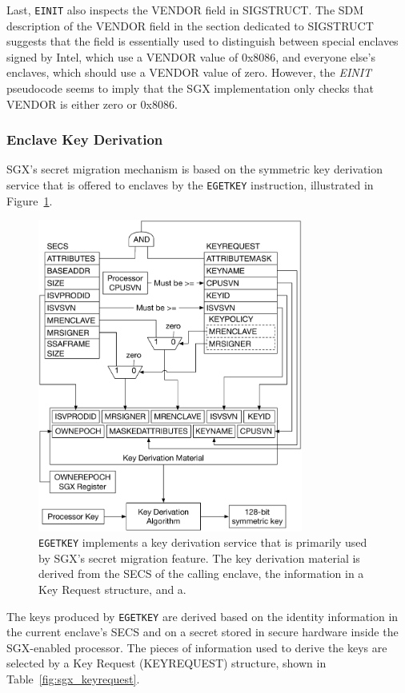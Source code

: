 Last, \texttt{EINIT} also inspects the VENDOR field in SIGSTRUCT. The SDM
description of the VENDOR field in the section dedicated to SIGSTRUCT suggests
that the field is essentially used to distinguish between special enclaves
signed by Intel, which use a VENDOR value of 0x8086, and everyone else's
enclaves, which should use a VENDOR value of zero. However, the \textit{EINIT}
pseudocode seems to imply that the SGX implementation only checks that
VENDOR is either zero or 0x8086.


\subsubsection{Enclave Key Derivation}
\label{sec:sgx_egetkey}

SGX's secret migration mechanism is based on the symmetric key derivation
service that is offered to enclaves by the \texttt{EGETKEY} instruction,
illustrated in Figure~\ref{fig:sgx_egetkey}.

\begin{figure}[hbt]
  \centering
  \includegraphics[width=87mm]{figures/sgx_egetkey.pdf}
  \caption{
    \texttt{EGETKEY} implements a key derivation service that is primarily used
    by SGX's secret migration feature. The key derivation material is derived
    from the SECS of the calling enclave, the information in a Key Request
    structure, and a.
  }
  \label{fig:sgx_egetkey}
\end{figure}

The keys produced by \texttt{EGETKEY} are derived based on the identity
information in the current enclave's SECS and on a secret stored in secure
hardware inside the SGX-enabled processor. The pieces of information used to
derive the keys are selected by a Key Request (KEYREQUEST) structure, shown in
Table~\ref{fig:sgx_keyrequest}.

